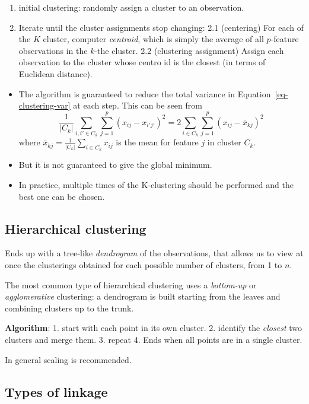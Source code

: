 \documentclass[
  letterpaper,
  DIV=11,
  numbers=noendperiod]{scrreprt}
\providecommand{\tightlist}{%
  \setlength{\itemsep}{0pt}\setlength{\parskip}{0pt}}\usepackage{longtable,booktabs,array}
\begin{document}
\begin{enumerate}
\def\labelenumi{\arabic{enumi}.}
\tightlist
\item
  initial clustering: randomly assign a cluster to an observation.
\item
  Iterate until the cluster assignments stop changing: 2.1 (centering)
  For each of the \(K\) cluster, computer \emph{centroid}, which is
  simply the average of all \(p\)-feature observations in the \(k\)-the
  cluster. 2.2 (clustering assignment) Assign each observation to the
  cluster whose centro id is the closest (in terms of Euclidean
  distance).
\end{enumerate}

\begin{itemize}
\item
  The algorithm is guaranteed to reduce the total variance in
  Equation~\ref{eq-clustering-var} at each step. This can be seen from
  \[
  \frac{1}{|C_k|}\sum_{i,i'\in C_k}\sum_{j=1}^p(x_{ij}-x_{i'j'})^2=2\sum_{i\in C_k}\sum_{j=1}^p (x_{ij}-\bar{x}_{kj})^2
  \] where \(\bar{x}_{kj}=\frac{1}{|C_k|}\sum_{i\in C_k}x_{ij}\) is the
  mean for feature \(j\) in cluster \(C_k\).
\item
  But it is not guaranteed to give the global minimum.
\item
  In practice, multiple times of the K-clustering should be performed
  and the best one can be chosen.
\end{itemize}

\subsection{Hierarchical clustering}\label{hierarchical-clustering}

Ends up with a tree-like \emph{dendrogram} of the observations, that
allows us to view at once the clusterings obtained for each possible
number of clusters, from 1 to \(n\).

The most common type of hierarchical clustering uses a \emph{bottom-up}
or \emph{agglomerative} clustering: a dendrogram is built starting from
the leaves and combining clusters up to the trunk.

\textbf{Algorithm}: 1. start with each point in its own cluster. 2.
identify the \emph{closest} two clusters and merge them. 3. repeat 4.
Ends when all points are in a single cluster.

In general scaling is recommended.

\subsection{Types of linkage}\label{types-of-linkage}
\end{document}
